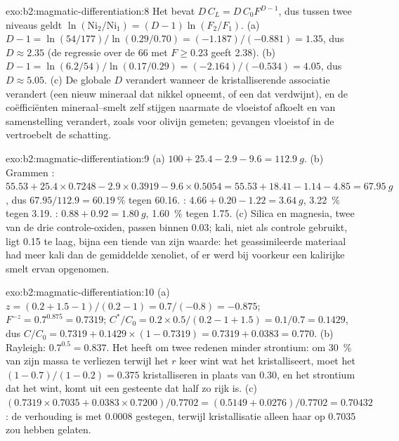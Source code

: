 \begin{solution}{exo:b2:magmatic-differentiation:8}
Het  bevat $D\,C_L = D\,C_0F^{D-1}$, dus tussen twee niveaus geldt
$\ln(\mathrm{Ni}_2/\mathrm{Ni}_1) = (D - 1)\ln(F_2/F_1)$. (a) $D - 1 = \ln(54/177)/
\ln(0.29/0.70) = (-1.187)/(-0.881) = 1.35$, dus $D \approx 2.35$ (de regressie over
de 66  met $F \ge 0.23$ geeft 2.38). (b) $D - 1 = \ln(6.2/54)/\ln(0.17/0.29) = (-2.164)/(-0.534)
= 4.05$, dus $D \approx 5.05$. (c) De globale $D$ verandert wanneer de kristalliserende
associatie verandert (een nieuw mineraal dat nikkel opneemt, of een dat verdwijnt), en
de coëfficiënten mineraal--smelt zelf stijgen naarmate de vloeistof afkoelt en van
samenstelling verandert, zoals voor olivijn gemeten; gevangen vloeistof in de  vertroebelt de
schatting.
\end{solution}

\begin{solution}{exo:b2:magmatic-differentiation:9}
(a) $100 + 25.4 - 2.9 - 9.6 = \qty{112.9}{g}$. (b) Grammen : $55.53 +
25.4\times0.7248 - 2.9\times0.3919 - 9.6\times0.5054 = 55.53 + 18.41 - 1.14 - 4.85 =
\qty{67.95}{g}$, dus $67.95/112.9 = \qty{60.19}{\percent}$ tegen 60.16. :
$4.66 + 0.20 - 1.22 = \qty{3.64}{g}$, \qty{3.22}{\percent} tegen 3.19. :
$0.88 + 0.92 = \qty{1.80}{g}$, \qty{1.60}{\percent} tegen 1.75. (c) Silica en magnesia, twee van de drie
controle-oxiden, passen binnen 0.03; kali, niet als controle gebruikt, ligt 0.15 te laag, bijna een
tiende van zijn waarde: het geassimileerde materiaal had meer kali dan de gemiddelde
xenoliet, of er werd bij voorkeur een kalirijke smelt ervan opgenomen.
\end{solution}

\begin{solution}{exo:b2:magmatic-differentiation:10}
(a) $z = (0.2 + 1.5 - 1)/(0.2 - 1) = 0.7/(-0.8) = -0.875$; $F^{-z} = 0.7^{0.875} =
0.7319$; $C^*/C_0 = 0.2\times0.5/(0.2 - 1 + 1.5) = 0.1/0.7 = 0.1429$, dus $C/C_0 =
0.7319 + 0.1429\times(1 - 0.7319) = 0.7319 + 0.0383 = 0.770$. (b) Rayleigh:
$0.7^{0.5} = 0.837$. Het  heeft om twee redenen minder strontium: om
\qty{30}{\percent} van zijn massa te verliezen terwijl het $r$ keer wint wat het kristalliseert, moet het
$(1 - 0.7)/(1 - 0.2) = 0.375$ kristalliseren in plaats van 0.30, en het strontium dat het wint,
komt uit een gesteente dat half zo rijk is. (c) $(0.7319\times0.7035 + 0.0383\times0.7200)/0.7702
= (0.5149 + 0.0276)/0.7702 = 0.70432$: de verhouding is met 0.0008 gestegen, terwijl
kristallisatie alleen haar op 0.7035 zou hebben gelaten.
\end{solution}

